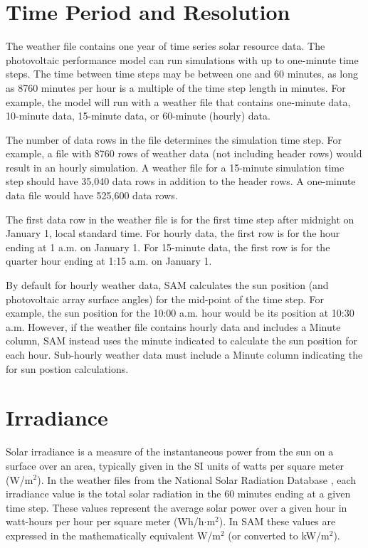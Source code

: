 \documentclass[12pt,letterpaper]{article}
\begin{document}
\section{Time Period and Resolution}\label{sec-timeconvention}

The weather file contains one year of time series solar resource data. The photovoltaic performance model can run simulations with up to one-minute time steps. The time between time steps may be between one and 60 minutes, as long as 8760 minutes per hour is a multiple of the time step length in minutes. For example, the model will run with a weather file that contains one-minute data, 10-minute data, 15-minute data, or 60-minute (hourly) data.

The number of data rows in the file determines the simulation time step. For example, a file with 8760 rows of weather data (not including header rows) would result in an hourly simulation. A weather file for a 15-minute simulation time step should have 35,040 data rows in addition to the header rows. A one-minute data file would have 525,600 data rows.

The first data row in the weather file is for the first time step after midnight on January 1, local standard time. For hourly data, the first row is for the hour ending at 1 a.m. on January 1. For 15-minute data, the first row is for the quarter hour ending at 1:15 a.m. on January 1.

By default for hourly weather data, SAM calculates the sun position (and photovoltaic array surface angles) for the mid-point of the time step. For example, the sun position for the 10:00 a.m. hour would be its position at 10:30 a.m. However, if the weather file contains hourly data and includes a Minute column, SAM instead uses the minute indicated to calculate the sun position for each hour. Sub-hourly weather data must include a Minute column indicating the for sun postion calculations.

\section{Irradiance}


Solar irradiance is a measure of the instantaneous power from the sun on a surface over an area, typically given in the SI units of watts per square meter (W/m$^2$). In the weather files from the National Solar Radiation Database \citep{nsrdb}, each irradiance value is the total solar radiation in the 60 minutes ending at a given time step. These values represent the average solar power over a given hour in watt-hours per hour per square meter (Wh/h$\cdot$m$^2$). In SAM these values are expressed in the mathematically equivalent W/m$^2$ (or converted to kW/m$^2$).
\end{document}
